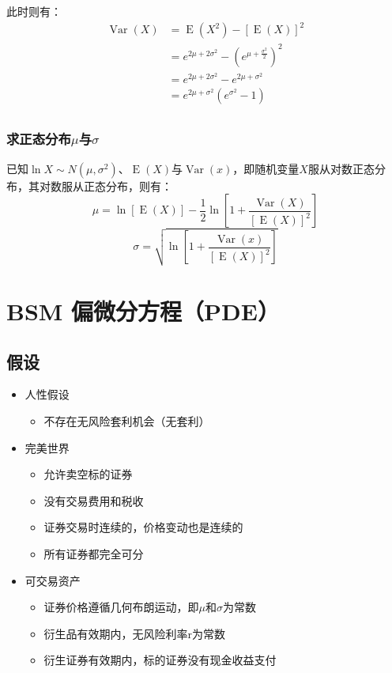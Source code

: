 \documentclass[11pt]{article}
\newcommand{\E}{\operatorname{E}}
\newcommand{\Var}{\operatorname{Var}}
\begin{document}
此时则有：
\begin{align*}
    \Var(X) &= \E(X^2) - [\E(X)]^2  \\
    &= e^{2\mu+2\sigma^2} - (e^{\mu+\frac{\sigma^2}{2}})^2 \\
    &= e^{2\mu+2\sigma^2} - e^{2\mu+\sigma^2} \\
    &= e^{2\mu+\sigma^2}\left(e^{\sigma^2} - 1\right)\\
\end{align*}

\subsubsection{求正态分布$\mu$与$\sigma$}

已知$\ln X \sim N(\mu,\sigma^2)$、$\E(X)$与$\Var(x)$，即随机变量$X$服从对数正态分布，其对数服从正态分布，则有：
\begin{equation*}
    \mu = \ln[\E(X)] - \frac{1}{2} \ln \left[1+\frac{\Var(X)}{[\E(X)]^2}\right]
\end{equation*}
\begin{equation*}
    \sigma = \sqrt{\ln \left[1+\frac{\Var(x)}{[\E(X)]^2}\right]}
\end{equation*}


\section{BSM 偏微分方程（PDE）}

\subsection{假设}
\begin{itemize}
    \item 人性假设
          \begin{itemize}
              \item 不存在无风险套利机会（无套利）
          \end{itemize}
    \item 完美世界
          \begin{itemize}
              \item 允许卖空标的证券
              \item 没有交易费用和税收
              \item 证券交易时连续的，价格变动也是连续的
              \item 所有证券都完全可分
          \end{itemize}
    \item 可交易资产
          \begin{itemize}
              \item 证券价格遵循几何布朗运动，即$\mu$和$\sigma$为常数
              \item 衍生品有效期内，无风险利率r为常数
              \item 衍生证券有效期内，标的证券没有现金收益支付
          \end{itemize}
\end{itemize}
\end{document}
